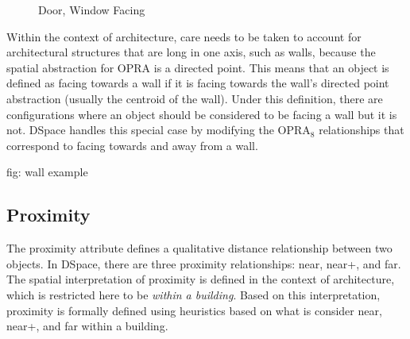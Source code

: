 \documentclass[12pt]{ucthesis}
\begin{document}
\begin{figure}[H]
 \centering
  \hspace{10 mm}
 \caption{Door, Window Facing}
\label{door-window-facing}
\end{figure}

Within the context of architecture, care needs to be taken to account for architectural structures that are long in one axis, such as walls, because the spatial abstraction for OPRA is a directed point. This means that an object is defined as facing towards a wall if it is facing towards the wall's directed point abstraction (usually the centroid of the wall). Under this definition, there are configurations where an object should be considered to be facing a wall but it is not. DSpace handles this special case by modifying the OPRA$_{8}$ relationships that correspond to facing towards and away from a wall. 

fig: wall example

\subsection{Proximity}
The proximity attribute defines a qualitative distance relationship between two objects. In DSpace, there are three proximity relationships: near, near+, and far. The spatial interpretation of proximity is defined in the context of architecture, which is restricted here to be \emph{within a building}. Based on this interpretation, proximity is formally defined using heuristics based on what is consider near, near+, and far within a building.   
\end{document}
